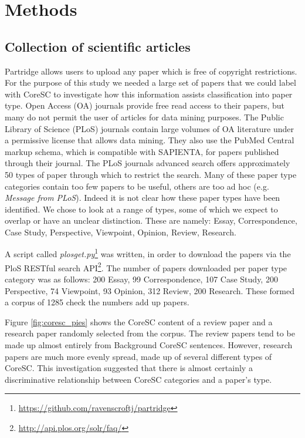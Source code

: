 \documentclass{svmult}
\begin{document}
\section{Methods}
\label{sec:2}

\subsection*{Collection of scientific articles} 
Partridge allows users to upload any paper which is free of copyright
restrictions.  For the purpose of this study we needed a large set of papers
that we could label with CoreSC to investigate how this information assists
classification into paper type.  Open Access (OA) journals provide free read
access to their papers, but many do not permit the user of articles for data
mining purposes. The Public Library of Science (PLoS) journals contain large
volumes of OA literature under a permissive license that allows data mining.
They also use the PubMed Central markup schema, which is compatible with
SAPIENTA, for papers published through their journal. The PLoS journals
advanced search offers approximately 50 types of paper through which to
restrict the search.  Many of these paper type categories contain too few
papers to be useful, others are too ad hoc (e.g.  {\it Message from PLoS}).
Indeed it is not clear how these paper types have been identified. We chose to
look at a range of types, some of which we expect to overlap or have an unclear
distinction.  These are namely: Essay, Correspondence, Case Study, Perspective,
Viewpoint, Opinion, Review, Research. 

A script called {\em plosget.py}\footnote{\url{https://github.com/ravenscroftj/partridge}} was written, in order to download the
papers via the PloS RESTful search API\footnote{\url{http://api.plos.org/solr/faq/}}. The number of papers downloaded per
paper type category was as follows: 200 Essay, 99 Correspondence, 107 Case
Study, 200 Perspective, 74 Viewpoint, 93 Opinion, 312 Review, 200 Research.
These formed a corpus of 1285 %
check the numbers add up papers.

Figure \ref{fig:coresc_pies} shows the CoreSC content of a review paper and a
research paper randomly selected from the corpus.  The review papers tend to be
made up almost entirely from Background CoreSC sentences.  However, research
papers are much more evenly spread, made up of several different types of
CoreSC.  This investigation suggested that there is almost certainly a
discriminative relationship between CoreSC categories and a paper's type. 
\end{document}
